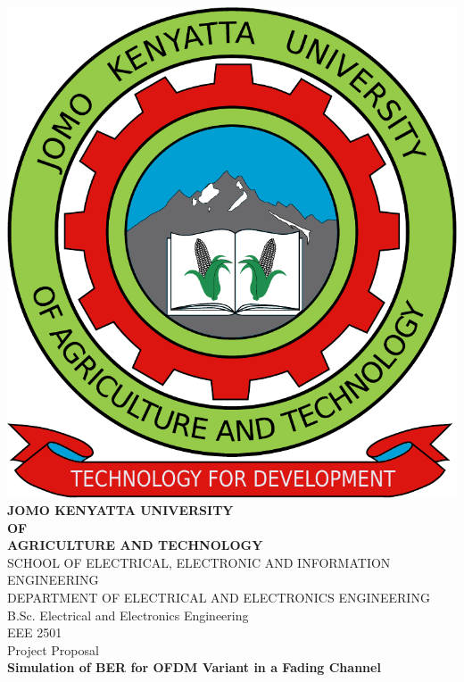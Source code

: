 \begin{spacing}{1.1}
\begin{titlepage}
  \begin{center}
    \includegraphics[scale=0.2]{Graphics/jkuat-logo.pdf}\\
		\vspace{0.5cm}
		\Large{\textbf{JOMO KENYATTA UNIVERSITY\\OF\\AGRICULTURE AND TECHNOLOGY\\}}
		\vspace{1cm}
		\small{SCHOOL OF ELECTRICAL, ELECTRONIC AND INFORMATION ENGINEERING\\
		DEPARTMENT OF ELECTRICAL AND ELECTRONICS ENGINEERING\\}
		\vspace*{\fill}
		B.Sc. Electrical and Electronics Engineering\\
		\vspace*{\fill}
		\large{EEE 2501\\Project Proposal\\}
		\vspace*{\fill}
		\Large{\textbf{Simulation of BER for OFDM Variant in a Fading Channel}\\}

\end{center}
\end{titlepage}
\end{spacing}
